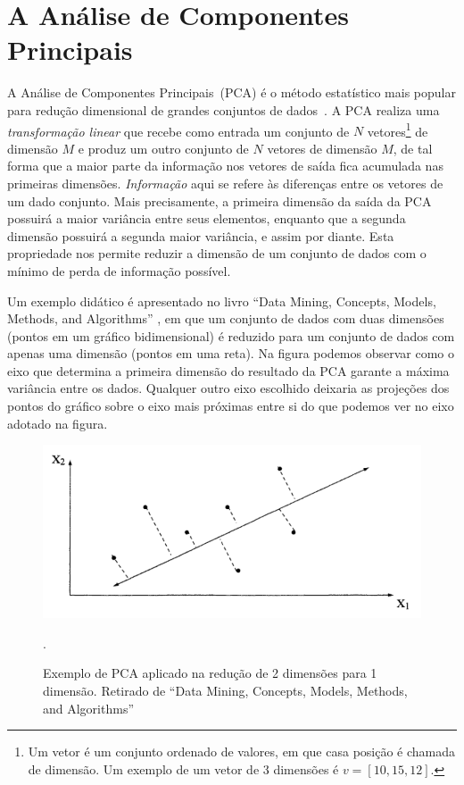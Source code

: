 \documentclass[a4paper, 12pt]{article}
\newcommand\pca{Análise de Componentes Principais}
\begin{document}
\section{A Análise de Componentes Principais}
\label{sec:pca}

A \pca\ (PCA) é o método estatístico mais popular para redução dimensional de grandes conjuntos de dados~\cite{DataMining2003}. A PCA realiza uma \emph{transformação linear} que recebe como entrada um conjunto de $N$ vetores\footnote{Um vetor é um conjunto ordenado de valores, em que casa posição é chamada de dimensão. Um exemplo de um vetor de 3 dimensões é $v = [10, 15, 12]$.} de dimensão $M$ e produz um outro conjunto de $N$ vetores de dimensão $M$, de tal forma que a maior parte da informação nos vetores de saída fica acumulada nas primeiras dimensões. \emph{Informação} aqui se refere às diferenças entre os vetores de um dado conjunto. Mais precisamente, a primeira dimensão da saída da PCA possuirá a maior variância entre seus elementos, enquanto que a segunda dimensão possuirá a segunda maior variância, e assim por diante. Esta propriedade nos permite reduzir a dimensão de um conjunto de dados com o mínimo de perda de informação possível.

Um exemplo didático é apresentado no livro ``Data Mining, Concepts, Models, Methods, and Algorithms'' \cite{DataMining2003}, em que um conjunto de dados com duas dimensões (pontos em um gráfico bidimensional) é reduzido para um conjunto de dados com apenas uma dimensão (pontos em uma reta). Na figura podemos observar como o eixo que determina a primeira dimensão do resultado da PCA garante a máxima variância  entre os dados. Qualquer outro eixo escolhido deixaria as projeções dos pontos do gráfico sobre o eixo mais próximas entre si do que podemos ver no eixo adotado na figura.

\begin{figure}
\center
\includegraphics[scale=0.5]{img/pca}
\label{img:pca}
\caption{Exemplo de PCA aplicado na redução de 2 dimensões para 1 dimensão. Retirado de ``Data Mining, Concepts, Models, Methods, and Algorithms'' \cite{DataMining2003}}.
\end{figure}
\end{document}
